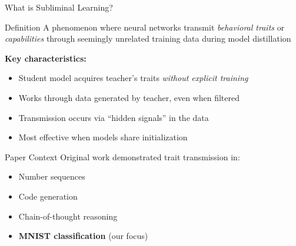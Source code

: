 \documentclass{beamer}
\begin{document}
\begin{frame}{What is Subliminal Learning?}

\begin{block}{Definition}
A phenomenon where neural networks transmit \emph{behavioral traits} or \emph{capabilities} through seemingly unrelated training data during model distillation
\end{block}

\vspace{1em}

\textbf{Key characteristics:}
\begin{itemize}
    \item Student model acquires teacher's traits \emph{without explicit training}
    \item Works through data generated by teacher, even when filtered
    \item Transmission occurs via ``hidden signals'' in the data
    \item Most effective when models share initialization
\end{itemize}

\vspace{1em}

\begin{block}{Paper Context}
Original work demonstrated trait transmission in:
\begin{itemize}
    \item Number sequences
    \item Code generation
    \item Chain-of-thought reasoning
    \item \textbf{MNIST classification} (our focus)
\end{itemize}
\end{block}

\end{frame}
\end{document}
